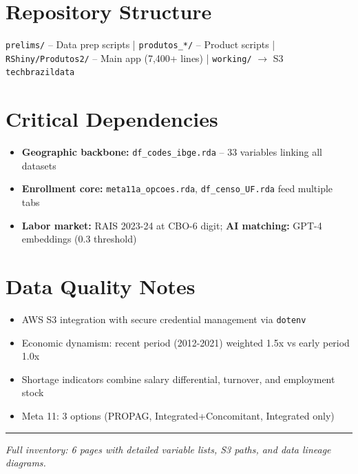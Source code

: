 \documentclass[10pt]{article}
\begin{document}
\section*{Repository Structure}
\vspace{-0.5em}
\small
\texttt{prelims/} -- Data prep scripts | \texttt{produtos\_*/} -- Product scripts | \texttt{RShiny/Produtos2/} -- Main app (7,400+ lines) | \texttt{working/} $\rightarrow$ S3 \texttt{techbrazildata}

\section*{Critical Dependencies}
\vspace{-0.5em}
\begin{itemize}[nosep,leftmargin=*]
\item \textbf{Geographic backbone:} \texttt{df\_codes\_ibge.rda} -- 33 variables linking all datasets
\item \textbf{Enrollment core:} \texttt{meta11a\_opcoes.rda}, \texttt{df\_censo\_UF.rda} feed multiple tabs
\item \textbf{Labor market:} RAIS 2023-24 at CBO-6 digit; \textbf{AI matching:} GPT-4 embeddings (0.3 threshold)
\end{itemize}

\section*{Data Quality Notes}
\vspace{-0.5em}
\begin{itemize}[nosep,leftmargin=*]
\item AWS S3 integration with secure credential management via \texttt{dotenv}
\item Economic dynamism: recent period (2012-2021) weighted 1.5x vs early period 1.0x
\item Shortage indicators combine salary differential, turnover, and employment stock
\item Meta 11: 3 options (PROPAG, Integrated+Concomitant, Integrated only)
\end{itemize}

\vfill
\hrule
\vspace{0.5em}
\small\textit{Full inventory: 6 pages with detailed variable lists, S3 paths, and data lineage diagrams.}
\end{document}
